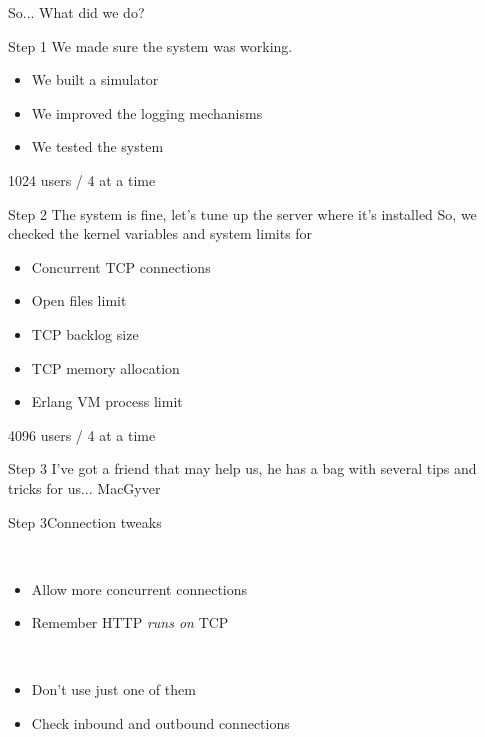 \documentclass[utf8]{beamer}
\begin{document}
\begin{frame}
So... What did we do?
\end{frame}

\begin{frame}{Step 1}
We made sure the system was working.
\pause
\begin{itemize}
	\item<+-> We built a simulator
	\item<+-> We improved the logging mechanisms
	\item<+-> We tested the system
\end{itemize}
\end{frame}

\begin{frame}
1024 users / 4 at a time
\end{frame}

\begin{frame}{Step 2}
The system is fine, let's tune up the server where it's installed
\pause
So, we checked the kernel variables and system limits for
\begin{itemize}
	\item<+-> Concurrent TCP connections
	\item<+-> Open files limit
	\item<+-> TCP backlog size
	\item<+-> TCP memory allocation
	\item<+-> Erlang VM process limit
\end{itemize}
\end{frame}

\begin{frame}
4096 users / 4 at a time
\end{frame}

\begin{frame}{Step 3}
I've got a friend that may help us, he has a bag with several tips and tricks for us...
\pause
MacGyver
\end{frame}

\begin{frame}{Step 3}{Connection tweaks}
	\begin{description}
		\item<+->[Backlog]\ \\
			\begin{itemize}
				\item Allow more concurrent connections
				\item Remember HTTP \emph{runs on} TCP
			\end{itemize}
		\item<+->[Connections]\ \\
			\begin{itemize}
				\item Don't use just one of them
				\item Check inbound and outbound connections
			\end{itemize}
	\end{description}
\end{frame}
\end{document}
